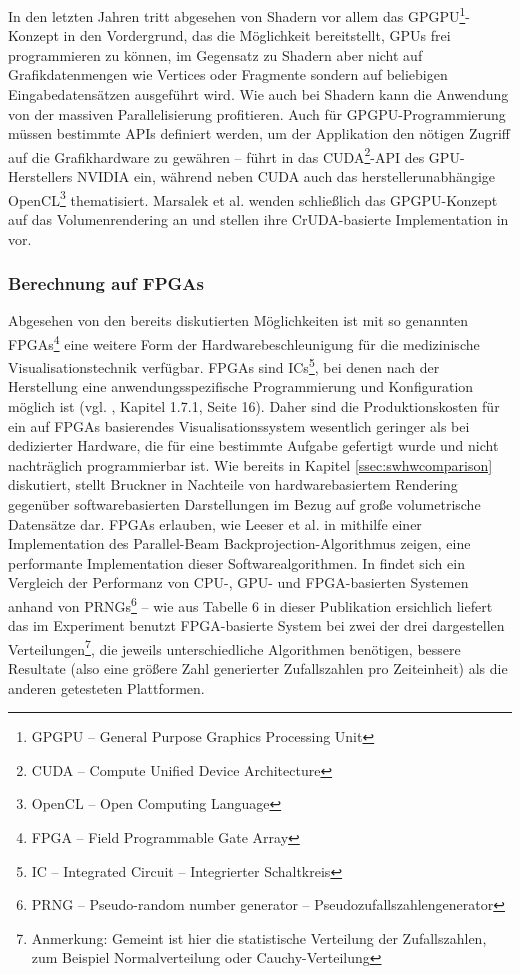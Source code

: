 \documentclass[ngerman,pdftex,paper=A4,DIV=calc,titlepage,12pt]{scrartcl}
\newtheorem[L]{boxedDefinition}{Definition}
\begin{document}
\marginpar[GPGPU]{}\label{m:gpgpu}In den letzten Jahren tritt abgesehen von Shadern vor allem das GPGPU\footnote{GPGPU -- General Purpose Graphics Processing Unit}-Konzept in den Vordergrund, das die Möglichkeit bereitstellt, GPUs frei programmieren zu können, im Gegensatz zu Shadern aber nicht auf Grafikdatenmengen wie Vertices oder Fragmente sondern auf beliebigen Eingabedatensätzen ausgeführt wird. Wie auch bei Shadern kann die Anwendung von der massiven Parallelisierung profitieren. Auch für GPGPU-Programmierung müssen bestimmte APIs definiert werden, um der Applikation den nötigen Zugriff auf die Grafikhardware zu gewähren -- \cite{Sanders2010} führt in das CUDA\footnote{CUDA -- Compute Unified Device Architecture}-API des GPU-Herstellers NVIDIA ein, während \cite{Kirk2010} neben CUDA auch das herstellerunabhängige OpenCL\footnote{OpenCL -- Open Computing Language} thematisiert. Marsalek et al. wenden schließlich das GPGPU-Konzept auf das Volumenrendering an und stellen ihre CrUDA-basierte Implementation in \cite{Marsalek2008} vor.
\subsubsection{Berechnung auf FPGAs}\label{sssec:fpgacalculation}
Abgesehen von den bereits diskutierten Möglichkeiten ist mit so genannten FPGAs\footnote{FPGA -- Field Programmable Gate Array} eine weitere Form der Hardwarebeschleunigung für die medizinische Visualisationstechnik verfügbar. FPGAs sind ICs\footnote{IC -- Integrated Circuit -- Integrierter Schaltkreis}, bei denen nach der Herstellung eine anwendungsspezifische Programmierung und Konfiguration möglich ist (vgl. \cite{Kibritev2009}, Kapitel 1.7.1, Seite 16). Daher sind die Produktionskosten für ein auf FPGAs basierendes Visualisationssystem wesentlich geringer als bei dedizierter Hardware, die für eine bestimmte Aufgabe gefertigt wurde und nicht nachträglich programmierbar ist. Wie bereits in Kapitel \vref{ssec:swhwcomparison} diskutiert, stellt Bruckner in \cite{Bruckner2004} Nachteile von hardwarebasiertem Rendering gegenüber softwarebasierten Darstellungen im Bezug auf große volumetrische Datensätze dar. FPGAs erlauben, wie Leeser et al. in \cite{Leeser2005} mithilfe einer Implementation des Parallel-Beam Backprojection-Algorithmus zeigen, eine performante Implementation dieser Softwarealgorithmen. In \cite{Thomas2009} findet sich ein Vergleich der Performanz von CPU-, GPU- und FPGA-basierten Systemen anhand von PRNGs\footnote{PRNG -- Pseudo-random number generator -- Pseudozufallszahlengenerator} -- wie aus Tabelle 6 in dieser Publikation ersichlich liefert das im Experiment benutzt FPGA-basierte System bei zwei der drei dargestellen Verteilungen\footnote{Anmerkung: Gemeint ist hier die statistische Verteilung der Zufallszahlen, zum Beispiel Normalverteilung oder Cauchy-Verteilung}, die jeweils unterschiedliche Algorithmen benötigen, bessere Resultate (also eine größere Zahl generierter Zufallszahlen pro Zeiteinheit) als die anderen getesteten Plattformen.
\end{document}
